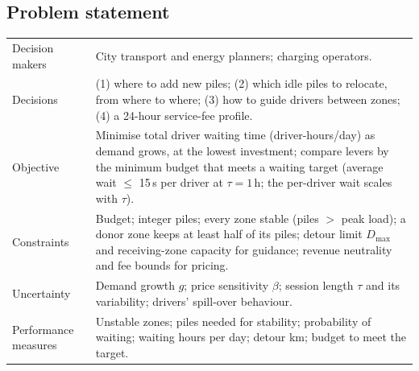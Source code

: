 \documentclass[11pt,a4paper]{article}
\begin{document}
\subsection{Problem statement}
\begin{center}\small
\begin{tabular}{@{}L{3.2cm}L{12.6cm}@{}}\toprule
Decision makers & City transport and energy planners; charging operators.\\
Decisions & (1) where to add new piles; (2) which idle piles to relocate, from where to where; (3) how to guide drivers between zones; (4) a 24-hour service-fee profile.\\
Objective & Minimise total driver waiting time (driver-hours/day) as demand grows, at the lowest investment; compare levers by the minimum budget that meets a waiting target (average wait $\le$ 15\,s per driver at $\tau = 1$\,h; the per-driver wait scales with $\tau$).\\
Constraints & Budget; integer piles; every zone stable (piles $>$ peak load); a donor zone keeps at least half of its piles; detour limit $D_{\max}$ and receiving-zone capacity for guidance; revenue neutrality and fee bounds for pricing.\\
Uncertainty & Demand growth $g$; price sensitivity $\beta$; session length $\tau$ and its variability; drivers' spill-over behaviour.\\
Performance measures & Unstable zones; piles needed for stability; probability of waiting; waiting hours per day; detour km; budget to meet the target.\\\bottomrule
\end{tabular}\end{center}
\end{document}
